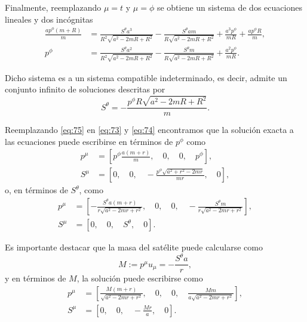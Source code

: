 Finalmente, reemplazando $\mu=t$ y $\mu=\phi$ se obtiene un sistema de dos ecuaciones lineales y dos incógnitas
\begin{align}
\frac{a p^{\phi}(m+R)}{m} &= \frac{S^{\theta} a^{3}}{R^{2} \sqrt{a^{2} - 2 m R + R^{2}}} - \frac{S^{\theta} a m}{R\sqrt{a^{2} - 2 m R + R^{2}}} + \frac{a^{3} p^{\phi}}{m R} + \frac{a p^{\phi} R}{m},\\
p^{\phi} &= \frac{S^{\theta} a^{2}}{R^{2}\sqrt{a^{2} - 2 m R + R^{2}}} - \frac{S^{\theta} m}{R\sqrt{a^{2} - 2 m R + R^{2}}} + \frac{a^{2} p^{\phi}}{m R}.
\end{align}

Dicho sistema es a un sistema compatible indeterminado, es decir, admite un conjunto infinito de soluciones descritas por
\begin{equation}
\label{eq:75}
S^{\theta} = - \frac{p^{\phi}R \sqrt{a^2 - 2mR +R^2}}{m}.
\end{equation}

Reemplazando \eqref{eq:75} en \eqref{eq:73} y \eqref{eq:74} encontramos que la solución exacta a las ecuaciones puede escribirse en términos de $p^{\phi}$ como
\begin{align}
p^{\mu} &= \left[ p^{\phi} \frac{a(m+r)}{m},\quad 0,\quad 0,\quad p^{\phi} \right],\\
S^{\mu} &= \left[0,\quad 0,\quad -\frac{p^{\phi} \sqrt{a^2+r^2-2mr}}{mr},\quad 0\right],
\end{align}
o, en términos de $S^{\theta}$, como
\begin{align}
\label{eq:76}
p^{\mu} &= \left [ - \frac{S^{\theta} a \left(m + r\right)}{r \sqrt{a^{2} - 2 m r + r^{2}} }, \quad 0, \quad 0, \quad - \frac{S^{\theta} m}{r\sqrt{a^{2} - 2 m r + r^{2}}}\right ],\\
\label{eq:77}
S^{\mu} &= \left [ 0, \quad 0, \quad S^{\theta}, \quad 0\right ].
\end{align}

Es importante destacar que la masa del satélite puede calcularse como
\begin{equation}
\label{eq:78}
M := p^{\mu} u_{\mu} = -\frac{S^{\theta}a}{r},
\end{equation}
y en términos de $M$, la solución puede escribirse como
\begin{align}
\label{eq:86}
p^{\mu} &= \left [ \frac{M \left(m + r\right)}{\sqrt{a^{2} - 2 m r + r^{2}}}, \quad 0, \quad 0, \quad \frac{M m}{a \sqrt{a^{2} - 2 m r + r^{2}}}\right ],\\
\label{eq:87}
S^{\mu} &= \left [ 0, \quad 0, \quad - \frac{Mr}{a}, \quad 0\right ].
\end{align}

